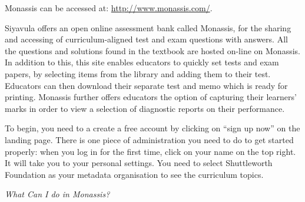 {\Large
Monassis can be accessed at: \underline{http://www.monassis.com/}.\par 

Siyavula offers an open online assessment bank called Monassis, for the sharing and accessing of curriculum-aligned test and exam questions with answers. All the questions and solutions found in the textbook are hosted on-line on Monassis. In addition to this, this site enables educators to quickly set tests and exam papers, by selecting items from the library and adding them to their test. Educators can then download their separate test and memo which is ready for printing. Monassis further offers educators the option of capturing their learners' marks in order to view a selection of diagnostic reports on their performance.\par 

To begin, you need to a create a free account by clicking on “sign up now” on the landing page. There is one piece of administration you need to do to get started properly: when you log in for the first time, click on your name on the top right. It will take you to your personal settings. You need to select Shuttleworth Foundation as your metadata organisation to see the curriculum topics.\par 

{\normalfont\sffamily\fontsize{16}\normalfont\itshape What Can I do in Monassis?}\par 

\begin{figure}[H]
\begin{center}
\end{center}
\end{figure}








}

